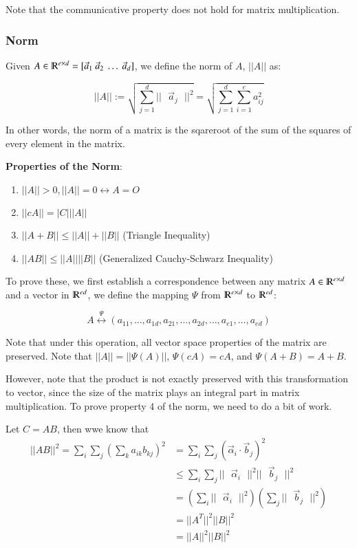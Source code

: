\documentclass [12 pt, twoside] {book}
\newcommand\+{\text{ }}
\begin{document}
Note that the communicative property does not hold for matrix multiplication.

\subsubsection{Norm}

Given $A \in \varmathbb{R}^{e \times d} = [\vec{a}_1 \+ \vec{a}_2 \+ \dots \+
\vec{a}_d]$, we define the norm of $A$, $||A||$ as:

\[
    ||A|| := \sqrt{\sum_{j = 1}^d ||\+\vec{a}_j\+||^2} = \sqrt{\sum_{j=1}^d
    \sum_{i=1}^e a_{ij}^2}
\]

In other words, the norm of a matrix is the sqareroot of the sum of the squares
of every element in the matrix.

\textbf{Properties of the Norm}:
\begin{enumerate}
    \item $||A|| > 0, ||A|| = 0 \leftrightarrow A = O$
    \item $||cA|| = |C|||A||$
    \item $||A+B|| \leq ||A|| + ||B||$ (Triangle Inequality)
    \item $||AB|| \leq ||A||||B||$ (Generalized Cauchy-Schwarz Inequality)
\end{enumerate}

To prove these, we first establish a correspondence between any matrix $A \in
\varmathbb{R}^{e \times d}$ and a vector in $\varmathbb{R}^{ed}$, we define the
mapping $\Psi$ from $\varmathbb{R}^{e \times d}$ to $\varmathbb{R}^{ed}$:

\[
    A \overset{\Psi}{\longleftrightarrow} (a_{11}, \dots, a_{1d}, a_{21}, \dots,
    a_{2d}, \dots, a_{e1}, \dots, a_{ed})
\]

Note that under this operation, all vector space properties of the matrix are
preserved. Note that $||A|| = ||\Psi(A)||$, $\Psi(cA) = cA$, and $\Psi(A + B) =
A + B$.

However, note that the product is not exactly preserved with this transformation
to vector, since the size of the matrix plays an integral part in matrix
multiplication. To prove property 4 of the norm, we need to do a bit of work.

Let $C = AB$, then wwe know that
\begin{align*}
    ||AB||^2 = \sum_i \sum_j \left(\sum_k a_{ik}b_{kj}\right)^2 &= \sum_i \sum_j
    (\vec{\alpha}_i \cdot \vec{b}_j)^2 \\
    &\leq \sum_i \sum_j ||\+\vec{\alpha}_i\+||^2 ||\+\vec{b}_j\+||^2\\
    &= (\sum_i ||\+\vec{\alpha}_i\+||^2)(\sum_j ||\+\vec{b}_j\+||^2)\\
    &= ||A^T||^2 ||B||^2\\
    &= ||A||^2 ||B||^2
\end{align*}
\end{document}
